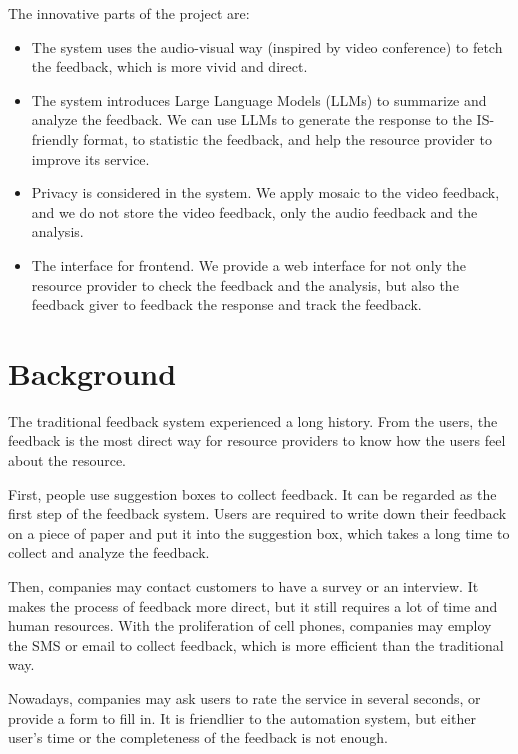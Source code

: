 \documentclass{article}
\begin{document}
    The innovative parts of the project are:

    \begin{itemize}
        \item The system uses the audio-visual way (inspired by video conference) to fetch the feedback, which is more vivid and direct.
        \item The system introduces Large Language Models (LLMs) to summarize and analyze the feedback.
        We can use LLMs to generate the response to the IS-friendly format, to statistic the feedback, and help the resource provider to improve its service.
        \item Privacy is considered in the system.
        We apply mosaic to the video feedback, and we do not store the video feedback, only the audio feedback and the analysis.
        \item The interface for frontend.
        We provide a web interface for not only the resource provider to check the feedback and the analysis, but also the feedback giver to feedback the response and track the feedback.
    \end{itemize}

    \section{Background}\label{sec:back}

    The traditional feedback system experienced a long history.
    From the users, the feedback is the most direct way for resource providers to know how the users feel about the resource.\cite{hogan2007}

    First, people use suggestion boxes to collect feedback.
    It can be regarded as the first step of the feedback system.
    Users are required to write down their feedback on a piece of paper and put it into the suggestion box, which takes a long time to collect and analyze the feedback.

    Then, companies may contact customers to have a survey or an interview.
    It makes the process of feedback more direct, but it still requires a lot of time and human resources.
    With the proliferation of cell phones, companies may employ the SMS or email to collect feedback, which is more efficient than the traditional way.

    Nowadays, companies may ask users to rate the service in several seconds, or provide a form to fill in.
    It is friendlier to the automation system, but either user's time or the completeness of the feedback is not enough.
\end{document}
